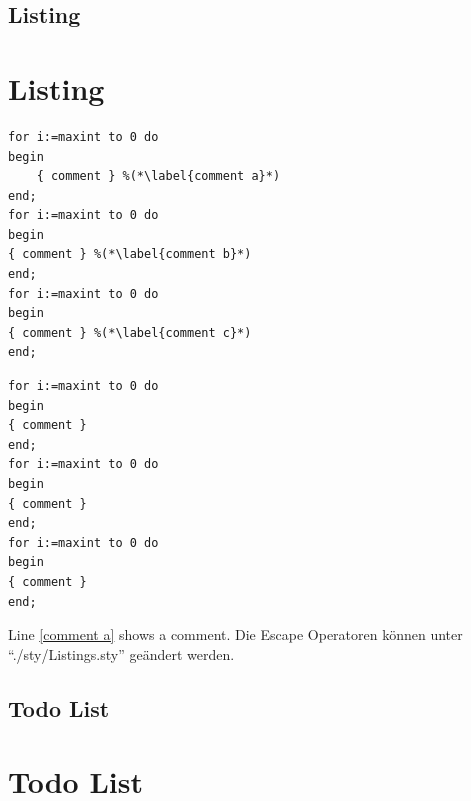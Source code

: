 \documentclass[./\jobname.tex]{subfiles}
\begin{document}
\begin{table}[H]
	\centering
	\noindent{}
	\label{tab: Tabelle C}
\end{table}
\if\paper\FHVmode
	\section{Listing}
\else
	\chapter{Listing}
\fi
%
\begin{lstlisting}[caption={example}]
for i:=maxint to 0 do
begin
	{ comment } %(*\label{comment a}*)
end;
for i:=maxint to 0 do
begin
{ comment } %(*\label{comment b}*)
end;
for i:=maxint to 0 do
begin
{ comment } %(*\label{comment c}*)
end;
\end{lstlisting}
%
\begin{lstlisting}[caption={example}]
for i:=maxint to 0 do
begin
{ comment } 
end;
for i:=maxint to 0 do
begin
{ comment }
end;
for i:=maxint to 0 do
begin
{ comment }
end;
\end{lstlisting}
%
Line \ref{comment a} shows a comment. Die Escape Operatoren können unter \enquote{./sty/Listings.sty} geändert werden. 
%
\if\paper\FHVmode
	\section{Todo List}
\else
	\chapter{Todo List}
\fi
%
\lipsum[1] 
\lipsum[2] 
\lipsum[3]
%
\if\paper\FHVmode
\end{document}
